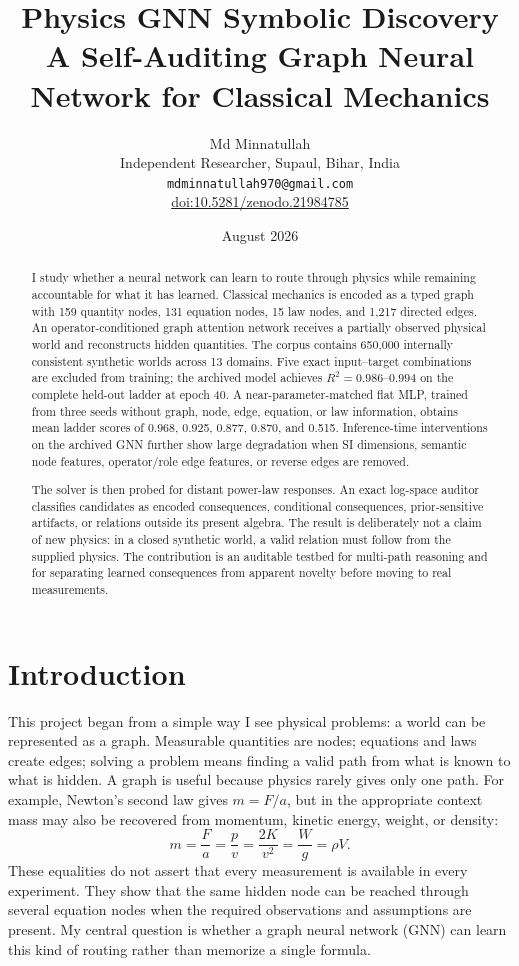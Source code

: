 \documentclass[10pt]{article}
\title{\vspace{-1.5em}\textbf{Physics GNN Symbolic Discovery}\\
\large A Self-Auditing Graph Neural Network for Classical Mechanics}
\author{Md Minnatullah\\
\small Independent Researcher, Supaul, Bihar, India\\
\small \texttt{mdminnatullah970@gmail.com}\\
\small \href{https://doi.org/10.5281/zenodo.21984785}{doi:10.5281/zenodo.21984785}}
\date{August 2026}
\begin{document}
\maketitle
\vspace{-1.2em}

\begin{abstract}
I study whether a neural network can learn to route through physics while remaining accountable for what it has learned. Classical mechanics is encoded as a typed graph with 159 quantity nodes, 131 equation nodes, 15 law nodes, and 1,217 directed edges. An operator-conditioned graph attention network receives a partially observed physical world and reconstructs hidden quantities. The corpus contains 650,000 internally consistent synthetic worlds across 13 domains. Five exact input--target combinations are excluded from training; the archived model achieves $R^2=0.986$--$0.994$ on the complete held-out ladder at epoch 40. A near-parameter-matched flat MLP, trained from three seeds without graph, node, edge, equation, or law information, obtains mean ladder scores of 0.968, 0.925, 0.877, 0.870, and 0.515. Inference-time interventions on the archived GNN further show large degradation when SI dimensions, semantic node features, operator/role edge features, or reverse edges are removed.

The solver is then probed for distant power-law responses. An exact log-space auditor classifies candidates as encoded consequences, conditional consequences, prior-sensitive artifacts, or relations outside its present algebra. The result is deliberately not a claim of new physics: in a closed synthetic world, a valid relation must follow from the supplied physics. The contribution is an auditable testbed for multi-path reasoning and for separating learned consequences from apparent novelty before moving to real measurements.
\end{abstract}

\section{Introduction}

This project began from a simple way I see physical problems: a world can be represented as a graph. Measurable quantities are nodes; equations and laws create edges; solving a problem means finding a valid path from what is known to what is hidden. A graph is useful because physics rarely gives only one path. For example, Newton's second law gives $m=F/a$, but in the appropriate context mass may also be recovered from momentum, kinetic energy, weight, or density:
\begin{equation}
 m=\frac{F}{a}
  =\frac{p}{v}
  =\frac{2K}{v^2}
  =\frac{W}{g}
  =\rho V .
 \label{eq:masspaths}
\end{equation}
These equalities do not assert that every measurement is available in every experiment. They show that the same hidden node can be reached through several equation nodes when the required observations and assumptions are present. My central question is whether a graph neural network (GNN) can learn this kind of routing rather than memorize a single formula.
\end{document}
